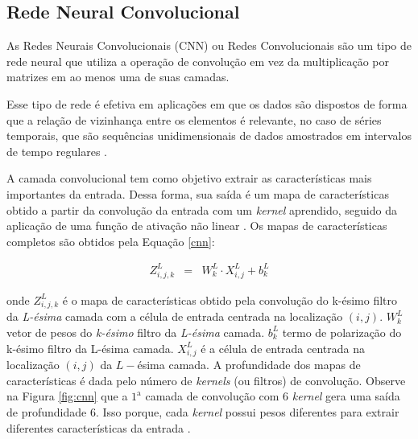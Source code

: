  
 
 
 \subsection{Rede Neural Convolucional}
 
 As Redes Neurais Convolucionais (CNN) ou Redes Convolucionais são um tipo de rede neural que utiliza a operação de convolução em vez da multiplicação por matrizes em ao menos uma de suas camadas.
 
 Esse tipo de rede é efetiva em aplicações \cite{7533055} em que os dados são dispostos de forma que a relação de vizinhança entre os elementos é relevante, no caso de séries temporais, que são sequências unidimensionais de dados amostrados em intervalos de tempo regulares \cite{silva_2021}.
 
 
 A camada convolucional tem como objetivo extrair as características mais importantes da entrada. Dessa forma, sua saída é um mapa de características obtido a partir da convolução da entrada com um \textit{kernel} aprendido, seguido da aplicação de uma função de ativação não linear \cite{lucas_2019}. Os mapas de características completos são obtidos pela Equação \eqref{cnn}:
 
 \begin{eqnarray}
 	Z_{i, j, k}^L&=&W_k^L \cdot X_{i, j}^L+b_k^L\label{cnn}
 \end{eqnarray}
 
 \noindent onde
 $Z_{i, j, k}^L$ é o mapa de características obtido pela convolução do k-ésimo filtro da \textit{L-ésima} camada com a célula de entrada centrada na localização $(i, j)$.
 $W_k^L$ vetor de pesos do \textit{k-ésimo} filtro da \textit{L-ésima} camada.
 $b_k^L$ termo de polarização do k-ésimo filtro da L-ésima camada.
 $X_{i, j}^L$ é a célula de entrada centrada na localização $(i,j)$ da $L-$ésima camada.
 A profundidade dos mapas de características é dada pelo número de \textit{kernels} (ou filtros) de convolução. Observe na Figura \ref{fig:cnn} que a $1^{\mathrm{a}}$
 camada de convolução com 6 \textit{kernel} gera uma saída de profundidade 6. Isso porque, cada \textit{kernel} possui pesos diferentes para extrair diferentes características da entrada \cite{lucas_2019}.
 
